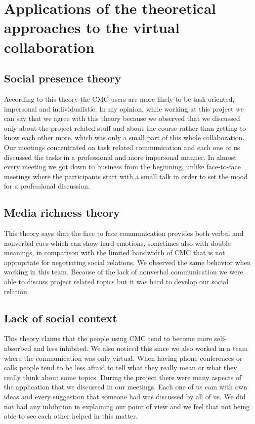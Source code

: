 
\chapter{Applications of the theoretical approaches to the virtual collaboration } %

\section{Social presence theory}
According to this theory the CMC users are more likely to be task oriented, impersonal and individualistic. In my opinion, while working at this project we can say that we agree with this theory because we observed that we discussed only about the project related stuff and about the course rather than getting to know each other more, which was only a small part of this whole collaboration. 
Our meetings concentrated on task related communication and each one of us discussed the tasks in a professional and more impersonal manner. In almost every meeting we got down to business from the beginning, unlike face-to-face meetings where the participants start with a small talk in order to set the mood for a professional discussion. 

\section{Media richness theory}
This theory says that the face to face communication provides both verbal and nonverbal cues which can show hard emotions, sometimes also with double meanings, in comparison with the limited bandwidth of CMC that is not appropriate for negotiating social relations. We observed the same behavior when working in this team. Because of the lack of nonverbal communication we were able to discuss project related topics but it was hard to develop our social relation.

\section{Lack of social context}
This theory claims that the people using CMC tend to become more self-absorbed and less inhibited. We also noticed this since we also worked in a team where the communication was only virtual. When having phone conferences or calls people tend to be less afraid to tell what they really mean or what they really think about some topics. During the project there were many aspects of the application that we discussed in our meetings. Each one of us cam with own ideas and every suggestion that someone had was discussed by all of us. We did not had any inhibition in explaining our point of view and we feel that not being able to see each other helped in this matter. 

